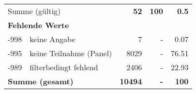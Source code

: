 \begin{longtable}{lXrrr}
     \midrule
     \multicolumn{2}{l}{Summe (gültig)} &
       \textbf{\num{52}} &
     \textbf{\num{100}} &
       \textbf{\num[round-mode=places,round-precision=2]{0.5}} \\
     \multicolumn{5}{l}{\textbf{Fehlende Werte}}\\
       -998 &
       keine Angabe &
         \num{7} &
        - &
         \num[round-mode=places,round-precision=2]{0.07} \\
       -995 &
       keine Teilnahme (Panel) &
         \num{8029} &
        - &
         \num[round-mode=places,round-precision=2]{76.51} \\
       -989 &
       filterbedingt fehlend &
         \num{2406} &
        - &
         \num[round-mode=places,round-precision=2]{22.93} \\
     \midrule
     \multicolumn{2}{l}{\textbf{Summe (gesamt)}} &
          \textbf{\num{10494}} &
        \textbf{-} &
        \textbf{\num{100}} \\
     \bottomrule
     \end{longtable}
     
